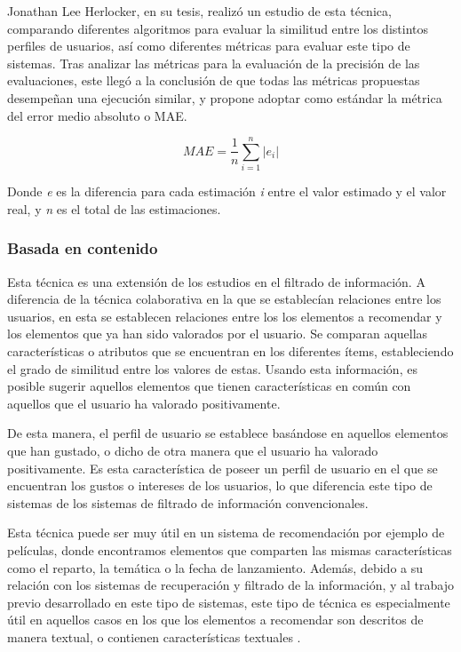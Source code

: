 Jonathan Lee Herlocker, en su tesis\cite{herlocker2000understanding}, realizó un estudio de esta técnica, comparando diferentes algoritmos para evaluar la similitud entre los distintos perfiles de usuarios, así como diferentes métricas para evaluar este tipo de sistemas. Tras analizar las métricas para la evaluación de la precisión de las evaluaciones, este llegó a la conclusión de que todas las métricas propuestas desempeñan una ejecución similar, y propone adoptar como estándar la métrica del error medio absoluto o \ac{MAE}. 

\[MAE = \frac{1}{n}\sum_{i=1}^{n}\left | e_{i} \right |\]

Donde \textit{e} es la diferencia para cada estimación \textit{i} entre el valor estimado y el valor real, y \textit{n} es el total de las estimaciones.


\subsubsection{Basada en contenido}
Esta técnica es una extensión de los estudios en el filtrado de información\cite{Hanani:2001:IFO:598287.598363}. A diferencia de la técnica colaborativa en la que se establecían relaciones entre los usuarios, en esta se establecen relaciones entre los los elementos a recomendar y los elementos que ya han sido valorados por el usuario. Se comparan aquellas características o atributos que se encuentran en los diferentes ítems, estableciendo el grado de similitud entre los valores de estas. Usando esta información, es posible sugerir aquellos elementos que tienen características en común con aquellos que el usuario ha valorado positivamente. 

De esta manera, el perfil de usuario se establece basándose en aquellos elementos que han gustado, o dicho de otra manera que el usuario ha valorado positivamente. Es esta característica de poseer un perfil de usuario en el que se encuentran los gustos o intereses de los usuarios, lo que diferencia este tipo de sistemas de los sistemas de filtrado de información convencionales.

Esta técnica puede ser muy útil en un sistema de recomendación por ejemplo de películas, donde encontramos elementos que comparten las mismas características como el reparto, la temática o la fecha de lanzamiento. Además, debido a su relación con los sistemas de recuperación y filtrado de la información, y al trabajo previo desarrollado en este tipo de sistemas, este tipo de técnica es especialmente útil en aquellos casos en los que los elementos a recomendar son descritos de manera textual, o contienen características textuales \cite{Mooney:2000:CBR:336597.336662}. 


